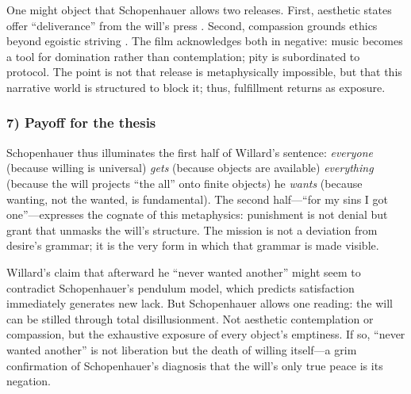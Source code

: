 One might object that Schopenhauer allows two releases. First, aesthetic states offer
``deliverance'' from the will's press \parencite[p.~178]{SchopenhauerWWR1969}. Second,
compassion grounds ethics beyond egoistic striving \parencite[pp.~372--374]{SchopenhauerWWR1969}.
The film acknowledges both in negative: music becomes a tool for domination rather than
contemplation; pity is subordinated to protocol. The point is not that release is metaphysically
impossible, but that this narrative world is structured to block it; thus, fulfillment returns
as exposure.

\subsubsection*{7) Payoff for the thesis}

Schopenhauer thus illuminates the first half of Willard's sentence: \emph{everyone} (because
willing is universal) \emph{gets} (because objects are available) \emph{everything} (because
the will projects ``the all'' onto finite objects) he \emph{wants} (because wanting, not the
wanted, is fundamental). The second half—``for my sins I got one''—expresses the cognate of this
metaphysics: punishment is not denial but grant that unmasks the will's structure. The mission
is not a deviation from desire's grammar; it is the very form in which that grammar is made
visible.

Willard's claim that afterward he ``never wanted another'' might seem to contradict
Schopenhauer's pendulum model, which predicts satisfaction immediately generates new lack. But
Schopenhauer allows one reading: the will can be stilled through total disillusionment. Not
aesthetic contemplation or compassion, but the exhaustive exposure of every object's
emptiness. If so, ``never wanted another'' is not liberation but the death of willing
itself---a grim confirmation of Schopenhauer's diagnosis that the will's only true peace is
its negation.
